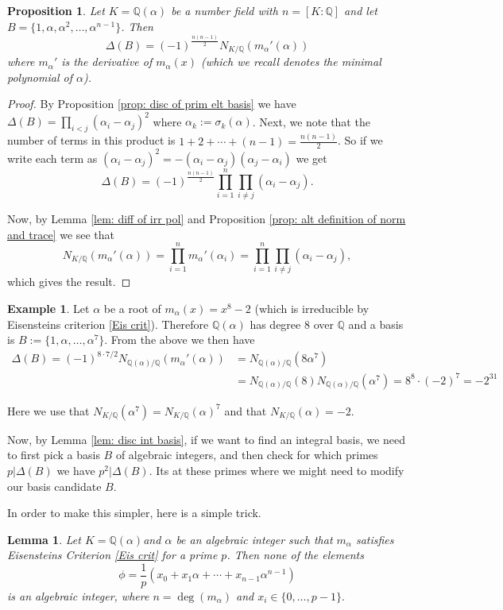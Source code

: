 \documentclass[11pt,a4paper]{report}
\theoremstyle{plain}
\newtheorem{lem}[subsection]{Lemma}
\newtheorem{prop}[subsection]{Proposition}
\theoremstyle{definition}
\newtheorem{exmp}[subsection]{Example}
\theoremstyle{definition}
\def\QQ{\mathbb{Q}}
\def \a{\alpha}
\begin{document}
	
	\begin{prop}\label{prop: num field disc in terms of norm}
		Let $K=\QQ(\a)$ be a number field with $n=[K:\QQ]$ and let $B=\{1,\a,\a^2,\dots,\a^{n-1}\}$. Then \[\Delta(B)=(-1)^{\frac{n(n-1)}{2}}N_{K/\QQ}(m_\a'(\a))\] where $m_\a'$ is the derivative of $m_\a(x)$ (which we recall denotes the minimal polynomial of $\a$).
		
	\end{prop}
	\begin{proof}
		By Proposition \ref{prop: disc of prim elt basis} we have $\Delta(B)=\prod_{i < j}(\a_i-\a_j)^2$ where $\a_k:=\sigma_k(\a)$. Next, we note that the number of terms in this product is $1+2+\cdots+(n-1)=\frac{n(n-1)}{2}$. So if we write each term as $(\a_i-\a_j)^2=-(\a_i-\a_j)(\a_j-\a_i)$ we get \[\Delta(B)=(-1)^{\frac{n(n-1)}{2}}\prod_{i=1}^n \prod_{i \neq j} (\a_i-\a_j). \]
		
		Now, by Lemma \ref{lem: diff of irr pol} and Proposition \ref{prop: alt definition of norm and trace} we see that \[N_{K/\QQ}(m_\a'(\a))=\prod_{i=1}^n m_\a'(\a_i)=\prod_{i=1}^n \prod_{i \neq j} (\a_i-\a_j),\] which gives the result.
		
		
	\end{proof}
	
	\begin{exmp}\label{exmp: disc of x^8-2}
		Let $\a$ be a root of $m_\a(x)=x^8-2$ (which is irreducible by Eisensteins criterion \ref{Eis crit}). Therefore $\QQ(\a)$ has degree $8$ over $\QQ$ and a basis is $B:=\{1,\a,\dots,\a^7\}$. From the above we then have \begin{align*}\Delta(B)= (-1)^{8\cdot7/2} N_{\QQ(\a)/\QQ} (m_\a'(\a))&= N_{\QQ(\a)/\QQ} (8\a^7)\\&=N_{\QQ(\a)/\QQ}(8) N_{\QQ(\a)/\QQ}(\a^7)=8^8 \cdot (-2)^7=-2^{31}\end{align*}
		
		Here we use that $N_{K/\QQ}(\a^7)=N_{K/\QQ}(\a)^7$ and that $N_{K/\QQ}(\a)=-2$. 
	\end{exmp}
	
	Now, by Lemma \ref{lem: disc int basis}, if we want to find an integral basis, we need to first pick a basis $B$ of algebraic integers, and then check for which primes $p|\Delta(B)$ we have $p^2| \Delta(B)$. Its at these primes where we might need to modify our basis candidate $B$.
	
	In order to make this simpler, here is a simple trick.
	
	\begin{lem}\label{lem: eis crit and alg ints}
		Let $K=\QQ(\a)$and $\a$ be an algebraic integer such that $m_\a$ satisfies Eisensteins Criterion \ref{Eis crit} for a prime $p$. Then none of the elements \[\phi=\frac{1}{p}(x_0+x_1\a+\cdots+x_{n-1}\a^{n-1})\] is an algebraic integer, where $n=\deg(m_\a)$ and $x_i \in \{0,\dots,p-1\}.$
	\end{lem} 
	
\end{document}
